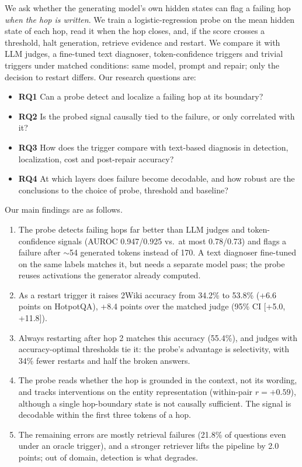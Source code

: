 \documentclass[11pt]{article}
\begin{document}
We ask whether the generating model's own hidden states can flag a failing hop \emph{when the hop is written}. We train a logistic-regression probe on the mean hidden state of each hop, read it when the hop closes, and, if the score crosses a threshold, halt generation, retrieve evidence and restart. We compare it with LLM judges, a fine-tuned text diagnoser, token-confidence triggers and trivial triggers under matched conditions: same model, prompt and repair; only the decision to restart differs. Our research questions are:

\begin{itemize}\itemsep0pt
\item \textbf{RQ1} Can a probe detect and localize a failing hop at its boundary?
\item \textbf{RQ2} Is the probed signal causally tied to the failure, or only correlated with it?
\item \textbf{RQ3} How does the trigger compare with text-based diagnosis in detection, localization, cost and post-repair accuracy?
\item \textbf{RQ4} At which layers does failure become decodable, and how robust are the conclusions to the choice of probe, threshold and baseline?
\end{itemize}

Our main findings are as follows.
\begin{enumerate}\itemsep0pt
\item The probe detects failing hops far better than LLM judges and token-confidence signals (AUROC 0.947/0.925 vs.\ at most 0.78/0.73) and flags a failure after $\sim$54 generated tokens instead of 170. A text diagnoser fine-tuned on the same labels matches it, but needs a separate model pass; the probe reuses activations the generator already computed.
\item As a restart trigger it raises 2Wiki accuracy from 34.2\% to 53.8\% (+6.6 points on HotpotQA), +8.4 points over the matched judge (95\% CI [+5.0, +11.8]).
\item Always restarting after hop 2 matches this accuracy (55.4\%), and judges with accuracy-optimal thresholds tie it: the probe's advantage is selectivity, with 34\% fewer restarts and half the broken answers.
\item The probe reads whether the hop is grounded in the context, not its wording, and tracks interventions on the entity representation (within-pair $r{=}+0.59$), although a single hop-boundary state is not causally sufficient. The signal is decodable within the first three tokens of a hop.
\item The remaining errors are mostly retrieval failures (21.8\% of questions even under an oracle trigger), and a stronger retriever lifts the pipeline by 2.0 points; out of domain, detection is what degrades.
\end{enumerate}
\end{document}
